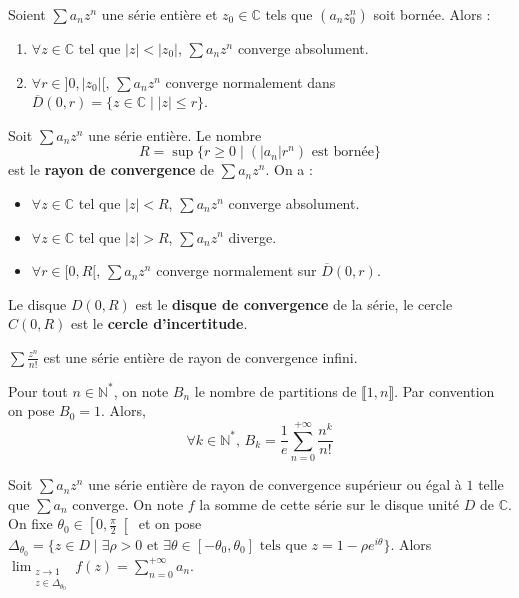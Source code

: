   \begin{lemma}[Abel]
    Soient $\sum a_n z^n$ une série entière et $z_0 \in \mathbb{C}$ tels que $(a_n z_0^n)$ soit bornée. Alors :
    \begin{enumerate}[label=(\roman*)]
      \item $\forall z \in \mathbb{C}$ tel que $|z| < |z_0|$, $\sum a_n z^n$ converge absolument.
      \item $\forall r \in ]0,|z_0|[, \, \sum a_n z^n$ converge normalement dans $\overline{D}(0, r) = \{ z \in \mathbb{C} \mid |z| \leq r \}$.
    \end{enumerate}
  \end{lemma}

  \begin{definition}
    Soit $\sum a_n z^n$ une série entière. Le nombre
    \[ R = \sup \{ r \geq 0 \mid (|a_n|r^n) \text{ est bornée} \} \]
    est le \textbf{rayon de convergence} de $\sum a_n z^n$. On a :
    \begin{itemize}
      \item $\forall z \in \mathbb{C}$ tel que $|z| < R$, $\sum a_n z^n$ converge absolument.
      \item $\forall z \in \mathbb{C}$ tel que $|z| > R$, $\sum a_n z^n$ diverge.
      \item $\forall r \in [0,R[$, $\sum a_n z^n$ converge normalement sur $\overline{D}(0,r)$.
    \end{itemize}
    Le disque $D(0,R)$ est le \textbf{disque de convergence} de la série, le cercle $C(0,R)$ est le \textbf{cercle d'incertitude}.
  \end{definition}

  \begin{example}
    $\sum \frac{z^n}{n!}$ est une série entière de rayon de convergence infini.
  \end{example}


  \begin{theorem}
    Pour tout $n \in \mathbb{N}^*$, on note $B_n$ le nombre de partitions de $\llbracket 1, n \rrbracket$. Par convention on pose $B_0 = 1$. Alors,
    \[ \forall k \in \mathbb{N}^*, \, B_k = \frac{1}{e} \sum_{n=0}^{+\infty} \frac{n^k}{n!} \]
  \end{theorem}


  \begin{theorem}
    \label{230-1}
    Soit $\sum a_n z^n$ une série entière de rayon de convergence supérieur ou égal à $1$ telle que $\sum a_n$ converge. On note $f$ la somme de cette série sur le disque unité $D$ de $\mathbb{C}$. On fixe $\theta_0 \in \left[ 0, \frac{\pi}{2} \right[$ et on pose $\Delta_{\theta_0} = \{ z \in D \mid \exists \rho > 0 \text{ et } \exists \theta \in [-\theta_0, \theta_0] \text{ tels que } z = 1 - \rho e^{i\theta} \}$.
    \newpar
    Alors $\lim_{\substack{z \rightarrow 1 \\ z \in \Delta_{\theta_0}}} f(z) = \sum_{n=0}^{+\infty} a_n$.
  \end{theorem}

